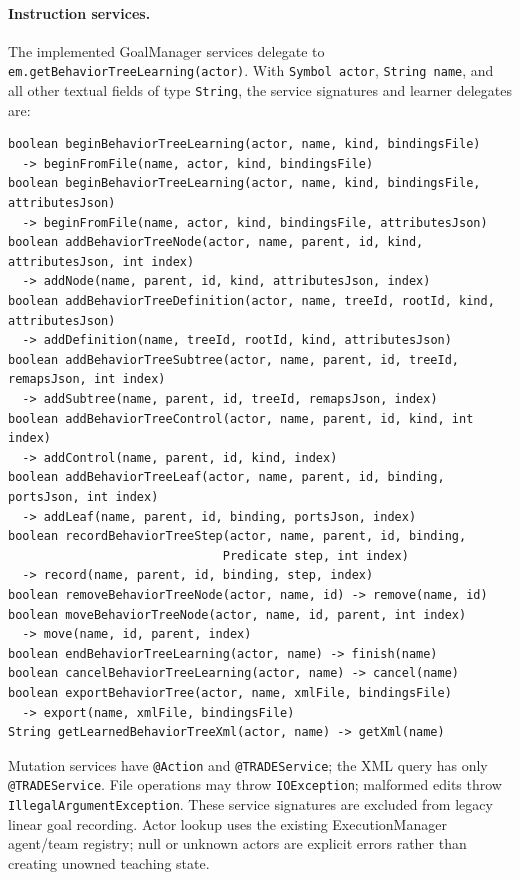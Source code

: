 \paragraph{Instruction services.}
The implemented GoalManager services delegate to
\texttt{em.getBehaviorTreeLearning(actor)}. With \texttt{Symbol actor},
\texttt{String name}, and all other textual fields of type \texttt{String},
the service signatures and learner delegates are:
\begin{verbatim}
boolean beginBehaviorTreeLearning(actor, name, kind, bindingsFile)
  -> beginFromFile(name, actor, kind, bindingsFile)
boolean beginBehaviorTreeLearning(actor, name, kind, bindingsFile, attributesJson)
  -> beginFromFile(name, actor, kind, bindingsFile, attributesJson)
boolean addBehaviorTreeNode(actor, name, parent, id, kind, attributesJson, int index)
  -> addNode(name, parent, id, kind, attributesJson, index)
boolean addBehaviorTreeDefinition(actor, name, treeId, rootId, kind, attributesJson)
  -> addDefinition(name, treeId, rootId, kind, attributesJson)
boolean addBehaviorTreeSubtree(actor, name, parent, id, treeId, remapsJson, int index)
  -> addSubtree(name, parent, id, treeId, remapsJson, index)
boolean addBehaviorTreeControl(actor, name, parent, id, kind, int index)
  -> addControl(name, parent, id, kind, index)
boolean addBehaviorTreeLeaf(actor, name, parent, id, binding, portsJson, int index)
  -> addLeaf(name, parent, id, binding, portsJson, index)
boolean recordBehaviorTreeStep(actor, name, parent, id, binding,
                              Predicate step, int index)
  -> record(name, parent, id, binding, step, index)
boolean removeBehaviorTreeNode(actor, name, id) -> remove(name, id)
boolean moveBehaviorTreeNode(actor, name, id, parent, int index)
  -> move(name, id, parent, index)
boolean endBehaviorTreeLearning(actor, name) -> finish(name)
boolean cancelBehaviorTreeLearning(actor, name) -> cancel(name)
boolean exportBehaviorTree(actor, name, xmlFile, bindingsFile)
  -> export(name, xmlFile, bindingsFile)
String getLearnedBehaviorTreeXml(actor, name) -> getXml(name)
\end{verbatim}
Mutation services have \texttt{@Action} and \texttt{@TRADEService};
the XML query has only \texttt{@TRADEService}. File operations may throw
\texttt{IOException}; malformed edits throw \texttt{IllegalArgumentException}.
These service signatures are excluded from legacy linear goal recording.
Actor lookup uses the existing ExecutionManager agent/team registry; null or
unknown actors are explicit errors rather than creating unowned teaching state.

